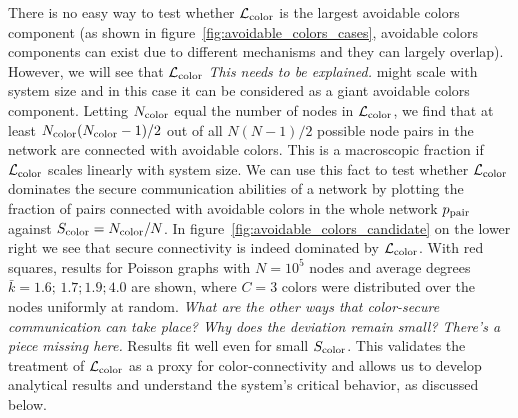 \documentclass[aps, pre, twocolumn, a4paper, superscriptaddress, floatfix]{revtex4}
\newcommand{\red}{\color{red}\footnotesize}
\begin{document}
There is no easy way to test whether $\mathcal{L}_{\rm color}$ is the largest avoidable colors component 
(as shown in figure~\ref{fig:avoidable_colors_cases}, avoidable colors components can exist due to 
different mechanisms and they can largely overlap). 
However, we will see that $\mathcal{L}_{\rm color}$ {\red \textit{This needs to be explained.} might} scale with system size 
and in this case it can be considered as a giant avoidable colors component. 
Letting $N_{\rm color}$ equal the number of nodes in $\mathcal{L}_{\rm color}$,
we find that at least $N_{\rm color}(N_{\rm color}-1)/2$ out of all $N(N-1)/2$ 
possible node pairs in the network are connected with avoidable colors. 
This is a macroscopic fraction if $\mathcal{L}_{\rm color}$ scales linearly with system size. 
{\red We can use this fact to test whether $\mathcal{L}_{\rm color}$ dominates the secure communication abilities 
of a network by plotting the fraction of pairs connected with avoidable colors in the 
whole network $p_{\rm pair}$ against $S_{\rm color}=N_{\rm color}/N$. 
In figure~\ref{fig:avoidable_colors_candidate} on the lower right we see that secure 
connectivity is indeed dominated by $\mathcal{L}_{\rm color}$. 
With red squares, results for Poisson graphs with $N=10^5$ nodes and average degrees 
${\bar k}=1.6;\,1.7;1.9;4.0$ are shown, where $C=3$ colors were distributed over the nodes 
uniformly at random. 
\textit{What are the other ways that color-secure communication can take place? Why does the deviation remain small? There's a piece missing here.}}
Results fit well even for small $S_{\rm color}$. 
This validates the treatment of $\mathcal{L}_{\rm color}$ as a proxy for color-connectivity and allows us to develop analytical results and understand the system's critical behavior, as discussed below. 
\end{document}
